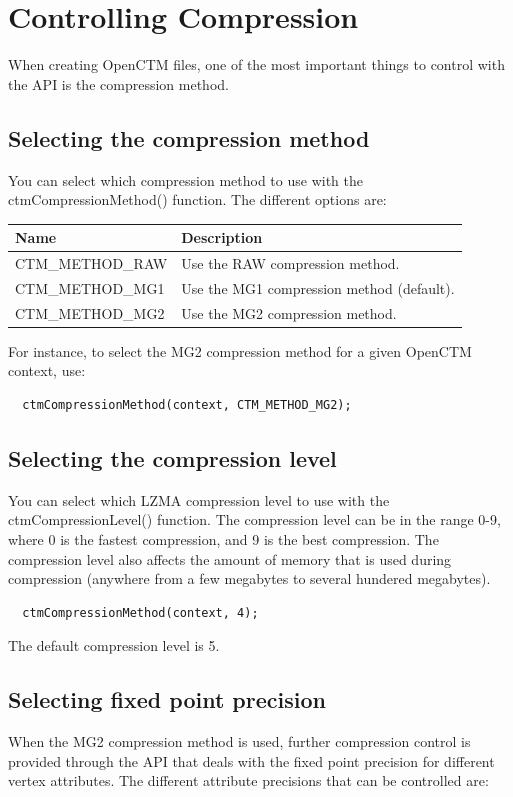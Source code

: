 
\chapter{Controlling Compression}
When creating OpenCTM files, one of the most important things to control with
the API is the compression method.


\section{Selecting the compression method}
You can select which compression method to use with the ctmCompressionMethod()
function. The different options are:

\begin{tabular}{|l|l|}\hline
\textbf{Name} & \textbf{Description}\\ \hline
CTM\_METHOD\_RAW & Use the RAW compression method.\\ \hline
CTM\_METHOD\_MG1 & Use the MG1 compression method (default).\\ \hline
CTM\_METHOD\_MG2 & Use the MG2 compression method.\\ \hline
\end{tabular}

For instance, to select the MG2 compression method for a given OpenCTM context,
use:

\begin{lstlisting}
  ctmCompressionMethod(context, CTM_METHOD_MG2);
\end{lstlisting}


\section{Selecting the compression level}
You can select which LZMA compression level to use with the ctmCompressionLevel()
function. The compression level can be in the range 0-9, where 0 is the fastest
compression, and 9 is the best compression. The compression level also affects the
amount of memory that is used during compression (anywhere from a few megabytes to
several hundered megabytes).

\begin{lstlisting}
  ctmCompressionMethod(context, 4);
\end{lstlisting}

The default compression level is 5.


\section{Selecting fixed point precision}
When the MG2 compression method is used, further compression control is provided
through the API that deals with the fixed point precision for different vertex
attributes. The different attribute precisions that can be controlled are:

